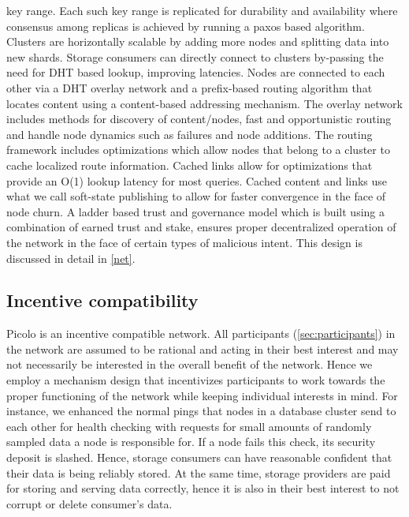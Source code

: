                                                                                                                                                                                                                                                                           {key range}. Each such key range is replicated for durability and availability where consensus among replicas is achieved by running a paxos based algorithm. Clusters are horizontally scalable by adding more nodes and splitting data into new shards. Storage consumers can directly connect to clusters by-passing the need for DHT based lookup, improving latencies.
\newline\newline
Nodes are connected to each other via a DHT overlay network and a prefix-based routing algorithm that locates content using a content-based addressing mechanism. The overlay network includes methods for discovery of
content/nodes, fast and opportunistic routing and handle node dynamics such as failures and node additions. The
routing framework includes optimizations which allow nodes that belong to a cluster to cache localized
route information. Cached links allow for optimizations that provide an O(1) lookup latency for most queries. Cached content and links use what we call soft-state publishing to allow for faster convergence in
the face of node churn. A ladder based trust and governance model which is built using a combination of earned trust
and stake, ensures proper decentralized operation of the network in the face of certain types of malicious intent. This
design is discussed in detail in \cref{net}.

\subsection{Incentive compatibility}
\textsf{Picolo} is an incentive compatible network. All participants (\cref{sec:participants}) in the network are assumed to be rational and acting in their best interest and may not necessarily be interested in the overall benefit of the network. Hence we employ a mechanism design that incentivizes participants to work towards the proper functioning of the network while keeping individual interests in mind. For instance, we enhanced the normal pings that nodes in a database cluster send to each other for health checking with requests for small amounts of randomly sampled data a node is responsible for. If a node fails this check, its security deposit is slashed. Hence, storage consumers can have reasonable confident that their data is being reliably stored. At the same time, storage providers are paid for storing and serving data correctly, hence it is also in their best interest to not corrupt or delete consumer's data.

